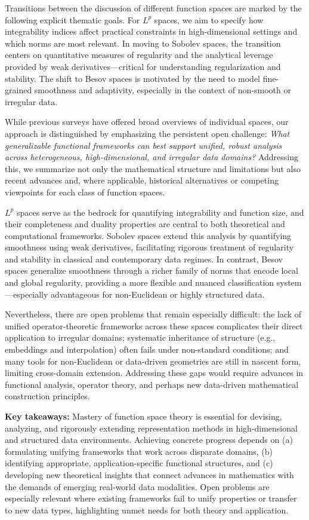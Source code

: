 \documentclass[sigconf]{acmart}
\begin{document}
Transitions between the discussion of different function spaces are marked by the following explicit thematic goals. For $L^p$ spaces, we aim to specify how integrability indices affect practical constraints in high-dimensional settings and which norms are most relevant. In moving to Sobolev spaces, the transition centers on quantitative measures of regularity and the analytical leverage provided by weak derivatives---critical for understanding regularization and stability. The shift to Besov spaces is motivated by the need to model fine-grained smoothness and adaptivity, especially in the context of non-smooth or irregular data.

While previous surveys have offered broad overviews of individual spaces, our approach is distinguished by emphasizing the persistent open challenge: \emph{What generalizable functional frameworks can best support unified, robust analysis across heterogeneous, high-dimensional, and irregular data domains?} Addressing this, we summarize not only the mathematical structure and limitations but also recent advances and, where applicable, historical alternatives or competing viewpoints for each class of function spaces.

$L^p$ spaces serve as the bedrock for quantifying integrability and function size, and their completeness and duality properties are central to both theoretical and computational frameworks. Sobolev spaces extend this analysis by quantifying smoothness using weak derivatives, facilitating rigorous treatment of regularity and stability in classical and contemporary data regimes. In contrast, Besov spaces generalize smoothness through a richer family of norms that encode local and global regularity, providing a more flexible and nuanced classification system---especially advantageous for non-Euclidean or highly structured data.

Nevertheless, there are open problems that remain especially difficult: the lack of unified operator-theoretic frameworks across these spaces complicates their direct application to irregular domains; systematic inheritance of structure (e.g., embeddings and interpolation) often fails under non-standard conditions; and many tools for non-Euclidean or data-driven geometries are still in nascent form, limiting cross-domain extension. Addressing these gaps would require advances in functional analysis, operator theory, and perhaps new data-driven mathematical construction principles.

\textbf{Key takeaways:} 
Mastery of function space theory is essential for devising, analyzing, and rigorously extending representation methods in high-dimensional and structured data environments. Achieving concrete progress depends on (a) formulating unifying frameworks that work across disparate domains, (b) identifying appropriate, application-specific functional structures, and (c) developing new theoretical insights that connect advances in mathematics with the demands of emerging real-world data modalities. Open problems are especially relevant where existing frameworks fail to unify properties or transfer to new data types, highlighting unmet needs for both theory and application.
\end{document}
